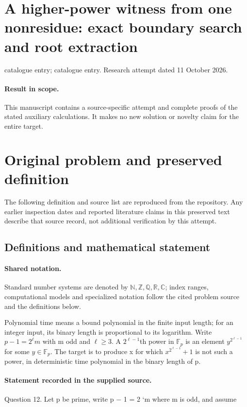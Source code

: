 \documentclass[11pt]{article}
\begin{document}
\section*{A higher-power witness from one nonresidue: exact boundary search and root extraction}
\noindent catalogue entry; catalogue entry. Research attempt dated 11 October 2026.
\paragraph{Result in scope.}This manuscript contains a source-specific attempt and complete proofs of the stated auxiliary calculations. It makes no new solution or novelty claim for the entire target.
\section{Original problem and preserved definition}
The following definition and source list are reproduced from the repository. Any earlier inspection dates and reported literature claims in this preserved text describe that source record, not additional verification by this attempt.
\subsection{Definitions and mathematical statement}

\paragraph{Shared notation.}Standard number systems are denoted by $\mathbb N,\mathbb Z,\mathbb Q,\mathbb R,\mathbb C$; index ranges, computational models and specialized notation follow the cited problem source and the definitions below.


Polynomial time means a bound polynomial in the finite input length; for an integer input, its binary length is proportional to its logarithm. Write $p-1=2^\ell m$ with m odd and $\ell\ge3$. A $2^{\ell-1}$th power in $\mathbb F_p$ is an element $y^{2^{\ell-1}}$ for some $y\in\mathbb F_p$. The target is to produce x for which $x^{2^{\ell-1}}+1$ is not such a power, in deterministic time polynomial in the binary length of p.
\paragraph{Statement recorded in the supplied source.}
Question 12. Let p be prime, write p − 1 = 2 `m where m is odd, and assume
\end{document}
